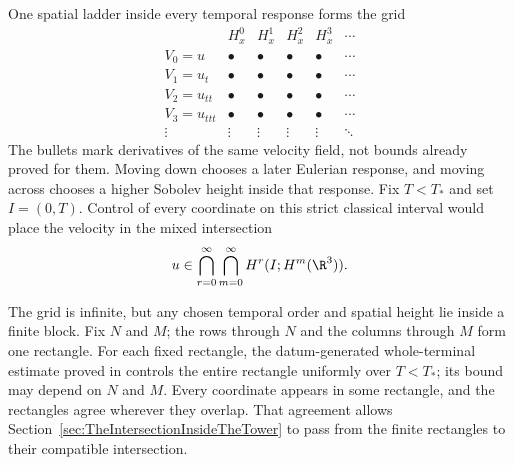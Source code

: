 One spatial ladder inside every temporal response forms the grid
{\small
\[
\begin{array}{c|ccccc}
 & H^0_x & H^1_x & H^2_x & H^3_x & \cdots\\
\hline
V_0=u      & \bullet & \bullet & \bullet & \bullet & \cdots\\
V_1=u_t    & \bullet & \bullet & \bullet & \bullet & \cdots\\
V_2=u_{tt} & \bullet & \bullet & \bullet & \bullet & \cdots\\
V_3=u_{ttt}& \bullet & \bullet & \bullet & \bullet & \cdots\\
\vdots     & \vdots  & \vdots  & \vdots  & \vdots  & \ddots
\end{array}
\]
}
The bullets mark derivatives of the same velocity field, not bounds already proved for them.
Moving down chooses a later Eulerian response, and moving across chooses a higher Sobolev height inside that response.
Fix \(T<T_*\) and set \(I=(0,T)\).
Control of every coordinate on this strict classical interval would place the velocity in the mixed intersection
\begin{equation}\label{eq:BodyDesiredMixedIntersection}
  u\in
  \bigcap_{r=0}^{\infty}
  \bigcap_{m=0}^{\infty}
  H^r(I;H^m(\R^3)).
\end{equation}

The grid is infinite, but any chosen temporal order and spatial height lie inside a finite block.
Fix \(N\) and \(M\); the rows through \(N\) and the columns through \(M\) form one rectangle.
For each fixed rectangle, the datum-generated whole-terminal estimate proved in  controls the entire rectangle uniformly over \(T<T_*\); its bound may depend on \(N\) and \(M\).
Every coordinate appears in some rectangle, and the rectangles agree wherever they overlap.
That agreement allows Section~\ref{sec:TheIntersectionInsideTheTower} to pass from the finite rectangles to their compatible intersection.
